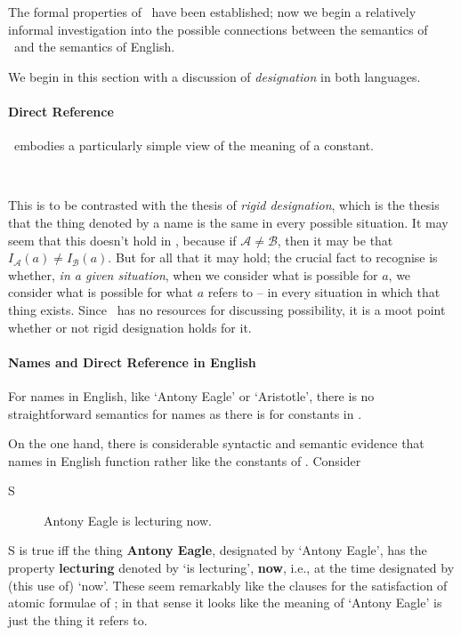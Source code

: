 The formal properties of \ltwo\ have been established; now we begin a relatively informal investigation into the possible connections between the semantics of \ltwo\ and the semantics of English.

We begin in this section with a discussion of \emph{designation} in both languages.

\paragraph{Direct Reference}

\ltwo\ embodies a particularly simple view of the meaning of a constant.

 ~

This is to be contrasted with the thesis of \emph{rigid designation}, which is the thesis that the thing denoted by a name is the same in every possible situation. It may seem that this doesn't hold in \ltwo, because if $\mathscr{A}\neq\mathscr{B}$, then it may be that  $I_{\mathscr{A}}(a)\neq I_{\mathscr{B}}(a)$. But for all that it may hold; the crucial fact to recognise is whether, \emph{in a given situation}, when we consider what is possible for $a$, we consider what is possible for what $a$ refers to – in every situation in which that thing exists. Since \ltwo\ has no resources for discussing possibility, it is a moot point whether or not rigid designation holds for it. 





\paragraph{Names and Direct Reference in English}

For names in English, like `Antony Eagle' or `Aristotle', there is no straightforward semantics for names as there is for constants in \ltwo.

On the one hand, there is considerable syntactic and semantic evidence that names in English function rather like the constants of \ltwo. Consider \begin{description}
	\item [S] Antony Eagle is lecturing now.
\end{description}  S is true  iff the thing \textbf{Antony Eagle}, designated by `Antony Eagle', has the property \textbf{lecturing} denoted by `is lecturing', \textbf{now}, i.e., at the time designated by (this use of) `now'. These seem remarkably like the clauses for the satisfaction of atomic formulae of \ltwo; in that sense it looks like the meaning of `Antony Eagle' is just the thing it refers to.

